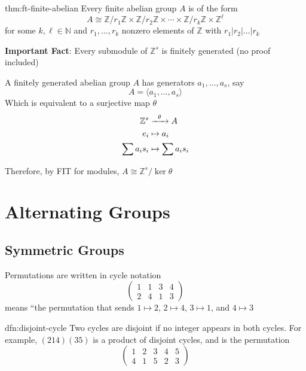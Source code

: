 \documentclass{article}
\begin{document}
\begin{thm}{thm:ft-finite-abelian}{}
    Every finite abelian group $A$ is of the form
    \[A \cong \mathbb{Z} /r_{1} \mathbb{Z} \times \mathbb{Z} /r_{2}\mathbb{Z} \times \cdots \times \mathbb{Z} / r_{k}\mathbb{Z} \times \mathbb{Z}^{\ell}\]
    for some $k,\ell \in \mathbb{N}$ and $r_{1},\dots,r_{k}$ nonzero elements of $\mathbb{Z}$ with $r_{1} | r_{2} | \dots | r_{k}$
\end{thm}

\textbf{Important Fact}: Every submodule of $\mathbb{Z}^{s}$ is finitely generated (no proof included)

A finitely generated abelian group $A$ has generators $a_{1},\dots,a_{s}$, say
\[
    A = \langle a_{1},\dots,a_{s} \rangle
\]
Which is equivalent to a surjective map $\theta$
\begin{align*}
    \mathbb{Z}^{s} &\prightarrow{\theta} A \\
    e_{i} &\mapsto a_{i}\\
    \sum a_{i}s_{i} &\mapsto \sum a_{i}s_{i}
\end{align*}

Therefore, by FIT for modules, $A \cong \mathbb{Z}^{s} /\ker\theta$

\section{Alternating Groups}

\subsection{Symmetric Groups}

Permutations are written in cycle notation
\[\begin{pmatrix}
    1 & 1 & 3 & 4\\
    2& 4& 1& 3
\end{pmatrix}\]
means ``the permutation that sends $1\mapsto 2$, $2 \mapsto 4$, $3\mapsto 1$, and $4\mapsto 3$

\begin{dfn}{dfn:disjoint-cycle}{}
    Two cycles are disjoint if no integer appears in both cycles. For example, $(214)(35)$ is a product of disjoint cycles, and is the permutation
    \[\begin{pmatrix}
        1& 2& 3& 4& 5\\
        4& 1& 5& 2& 3
    \end{pmatrix}\]
\end{dfn}
\end{document}
